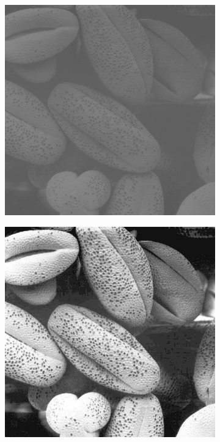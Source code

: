 \begin{figure}[h!]
	\centering
	\begin{subfigure}[b]{0.45\linewidth}
		\includegraphics[width=\linewidth]{myfigure/p1/Fig2.jpg}
		\caption{}
		\label{fig:Fig2}
	\end{subfigure}
	\begin{subfigure}[b]{0.45\linewidth}
		\includegraphics[width=\linewidth]{myfigure/p1/g2.png}

\end{subfigure}
\end{figure}
